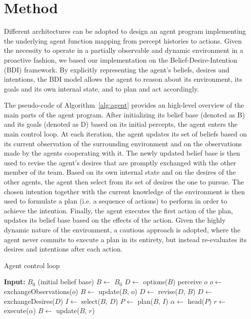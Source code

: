 \section{Method}

Different architectures can be adopted to design an agent program implementing the underlying agent function mapping from percept histories to actions. Given the necessity to operate in a partially observable and dynamic environment in a proactive fashion, we based our implementation on the Belief-Desire-Intention (BDI) framework. By explicitly representing the agent's beliefs, desires and intentions, the BDI model allows the agent to reason about its environment, its goals and its own internal state, and to plan and act accordingly.

The pseudo-code of Algorithm~\ref{alg:agent} provides an high-level overview of the main parts of the agent program. After initializing its belief base (denoted as B) and its goals (denoted as D) based on its initial percepts, the agent enters the main control loop. At each iteration, the agent updates its set of beliefs based on its current observation of the surrounding environment and on the observations made by the agents cooperating with it. The newly updated belief base is then used to revise the agent's desires that are promptly exchanged with the other member of its team. Based on its own internal state and on the desires of the other agents, the agent then select from its set of desires the one to pursue. The chosen intention together with the current knowledge of the environment is then used to formulate a plan (i.e. a sequence of actions) to perform in order to achieve the intention. Finally, the agent executes the first action of the plan, updates its belief base based on the effects of the action. Given the highly dynamic nature of the environment, a cautious approach is adopted, where the agent never commits to execute a plan in its entirety, but instead re-evaluates its desires and intentions after each action.

\begin{algorithm}
    \caption{Agent control loop}
    \label{alg:agent}
    \begin{algorithmic}
        \item \textbf{Input:} $B_0$ (initial belief base)
        \State $B \gets$ $B_0$
        \State $D \gets$ options($B$)
        \State perceive $o$
        \State $o \gets$ exchangeObservations($o$)
        \State $B \gets$ update($B$, $o$)
        \State $D \gets$ revise($D$, $B$)
        \State $D \gets$ exchangeDesires($D$)
        \State $I \gets$ select($B$, $D$)
        \State $P \gets$ plan($B$, $I$)
        \State $\alpha \gets$ head($P$)
        \State $r \gets$ execute($\alpha$)
        \State $B \gets$ update($B$, $r$)
        \EndWhile
    \end{algorithmic}
\end{algorithm}


